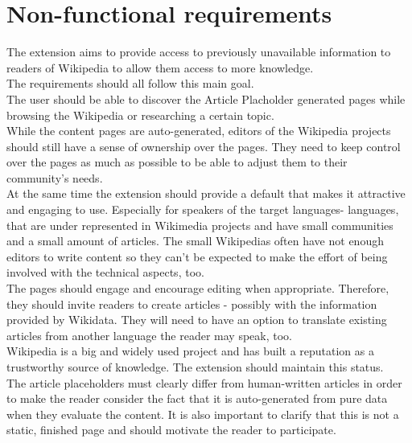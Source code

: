 \chapter{Non-functional requirements}

The extension aims to provide access to previously unavailable information to readers of Wikipedia to allow them access to more knowledge. \\
The requirements should all follow this main goal. \\
The user should be able to discover the Article Placholder generated pages while browsing the Wikipedia or researching a certain topic. \\
While the content pages are auto-generated, editors of the Wikipedia projects should still have a sense of ownership over the pages. They need to keep control over the pages as much as possible to be able to adjust them to their community's needs. \\
At the same time the extension should provide a default that makes it attractive and engaging to use. Especially for speakers of the target languages- languages, that are under represented in Wikimedia projects and have small communities and a small amount of articles. The small Wikipedias often have not  enough editors to write content so they can't be expected to make the effort of being involved with the technical aspects, too.  \\
The pages should engage and encourage editing when appropriate. Therefore, they should invite readers to create articles - possibly with the information provided by Wikidata. They will need to have an option to translate existing articles from another language the reader may speak, too. \\
Wikipedia is a big and widely used project and has built a reputation as a trustworthy source of knowledge. The extension should maintain this status. \\
The article placeholders must clearly differ from human-written articles in order to make the reader consider the fact that it is auto-generated from pure data when they evaluate the content. It is also important to clarify that this is not a static, finished page and should motivate the reader to participate. \\
